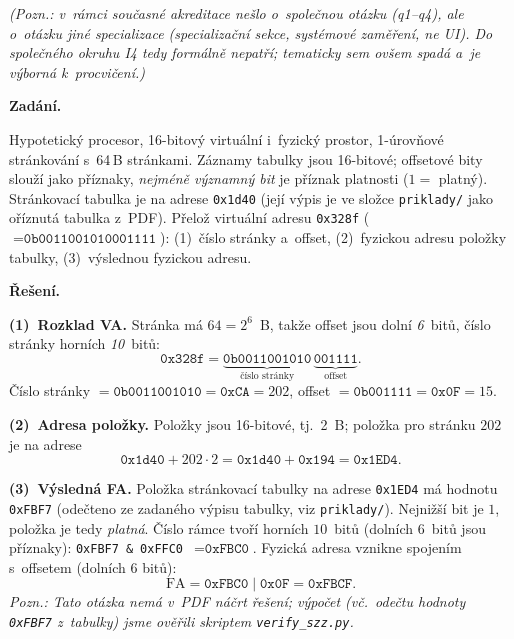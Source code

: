 \begin{priklad}
\par
\noindent\textit{(Pozn.: v~rámci současné akreditace nešlo o~společnou otázku (q1--q4), ale o~otázku jiné specializace (specializační sekce, systémové zaměření, ne UI). Do společného okruhu I4 tedy formálně nepatří; tematicky sem ovšem spadá a~je výborná k~procvičení.)}\par
\textbf{Zadání.}\par
Hypotetický procesor, 16-bitový virtuální i~fyzický prostor, 1-úrovňové stránkování s~64\,B stránkami. Záznamy tabulky jsou 16-bitové; offsetové bity slouží jako příznaky, \emph{nejméně významný bit} je příznak platnosti ($1=$ platný). Stránkovací tabulka je na adrese \texttt{0x1d40} (její výpis je ve složce \texttt{priklady/} jako oříznutá tabulka z~PDF). Přelož virtuální adresu \texttt{0x328f} ($=\texttt{0b0011001010001111}$): (1)~číslo stránky a~offset, (2)~fyzickou adresu položky tabulky, (3)~výslednou fyzickou adresu.

\medskip
\textbf{Řešení.}\par
\textbf{(1)~Rozklad VA.} Stránka má $64=2^{6}$~B, takže offset jsou dolní \emph{6}~bitů, číslo stránky horních \emph{10}~bitů:
\[
\texttt{0x328f}=\underbrace{\texttt{0b0011001010}}_{\text{číslo stránky}}\,\underbrace{\texttt{001111}}_{\text{offset}}.
\]
Číslo stránky $=\texttt{0b0011001010}=\boxed{\texttt{0xCA}=202}$, offset $=\texttt{0b001111}=\boxed{\texttt{0x0F}=15}$.

\textbf{(2)~Adresa položky.} Položky jsou 16-bitové, tj.\ 2~B; položka pro stránku $202$ je na adrese
\[
\texttt{0x1d40}+202\cdot 2=\texttt{0x1d40}+\texttt{0x194}=\boxed{\texttt{0x1ED4}}.
\]

\textbf{(3)~Výsledná FA.} Položka stránkovací tabulky na adrese \texttt{0x1ED4} má hodnotu \texttt{0xFBF7} (odečteno ze zadaného výpisu tabulky, viz \texttt{priklady/}). Nejnižší bit je $1$, položka je tedy \emph{platná}. Číslo rámce tvoří horních $10$~bitů (dolních $6$~bitů jsou příznaky): \texttt{0xFBF7}~\texttt{\&}~\texttt{0xFFC0}~$=\texttt{0xFBC0}$. Fyzická adresa vznikne spojením s~offsetem (dolních 6 bitů):
\[
\text{FA}=\texttt{0xFBC0}\;|\;\texttt{0x0F}=\boxed{\texttt{0xFBCF}}.
\]
\textit{Pozn.: Tato otázka nemá v~PDF náčrt řešení; výpočet (vč.\ odečtu hodnoty \texttt{0xFBF7} z~tabulky) jsme ověřili skriptem \texttt{verify\_szz.py}.}
\end{priklad}

